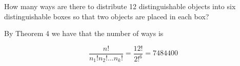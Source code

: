 \documentclass[../main.tex]{subfiles}
\begin{document}
How many ways are there to distribute 12 distinguishable objects into six distinguishable boxes so that two objects are placed in each box?

\solution

By Theorem 4 we have that the number of ways is

\[ \frac{n!}{n_1!n_2! \dots n_k!} = \frac{12!}{2!^6} = 7484400 \]
\end{document}
